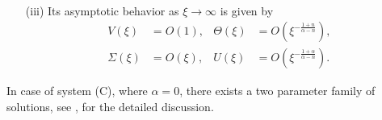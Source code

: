 \documentclass[graybox]{svmult}
\begin{document}
\begin{theorem}
\begin{enumerate}
\begin{equation}
\begin{aligned}
  \end{aligned}
  \end{equation}
  \item[(iii)] Its asymptotic behavior as $\xi \rightarrow \infty$ is given by
  \begin{equation} \label{eq:ss_asymp1}
  \begin{aligned}
    V(\xi) &= O(1), &    \Theta(\xi) &= O(\xi^{-\frac{1+n}{\alpha-n}}),\\
   \Sigma(\xi) &= O(\xi), &   U(\xi) &= O(\xi^{-\frac{1+\alpha}{\alpha-n}}).
  \end{aligned}
  \end{equation}
 \end{enumerate}
\end{theorem}

In case of system (C), where  $\alpha=0$,  there exists a two parameter family of solutions,  see \cite{KLT_2016}, \cite{LT16} for the detailed discussion. 
\end{document}
